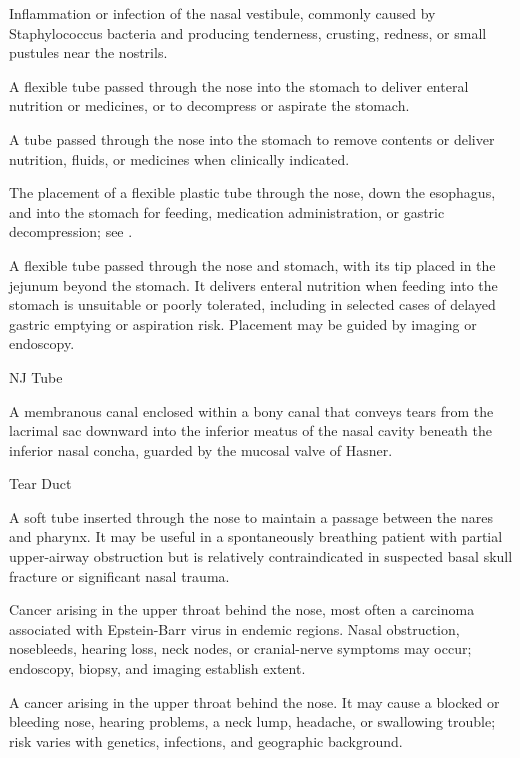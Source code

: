  Inflammation or infection of the nasal vestibule, commonly caused by Staphylococcus bacteria and producing tenderness, crusting, redness, or small pustules near the nostrils.

 A flexible tube passed through the nose into the stomach to deliver enteral nutrition or medicines, or to decompress or aspirate the stomach.

 A tube passed through the nose into the stomach to remove contents or deliver nutrition, fluids, or medicines when clinically indicated.

 The placement of a flexible plastic tube through the nose, down the esophagus, and into the stomach for feeding, medication administration, or gastric decompression; see .

 A flexible tube passed through the nose and stomach, with its tip placed in the jejunum beyond the stomach. It delivers enteral nutrition when feeding into the stomach is unsuitable or poorly tolerated, including in selected cases of delayed gastric emptying or aspiration risk. Placement may be guided by imaging or endoscopy.

\synonyms
NJ Tube

 A membranous canal enclosed within a bony canal that conveys tears from the lacrimal sac downward into the inferior meatus of the nasal cavity beneath the inferior nasal concha, guarded by the mucosal valve of Hasner.

\synonyms
Tear Duct

 A soft tube inserted through the nose to maintain a passage between the nares and
pharynx. It may be useful in a spontaneously breathing patient with partial upper-airway
obstruction but is relatively contraindicated in suspected basal skull fracture or
significant nasal trauma.

 Cancer arising in the upper throat behind the nose, most often a carcinoma associated with Epstein-Barr virus in endemic regions. Nasal obstruction, nosebleeds, hearing loss, neck nodes, or cranial-nerve symptoms may occur; endoscopy, biopsy, and imaging establish extent.

 A cancer arising in the upper throat behind the nose. It may cause a blocked or bleeding nose, hearing problems, a neck lump, headache, or swallowing trouble; risk varies with genetics, infections, and geographic background.

